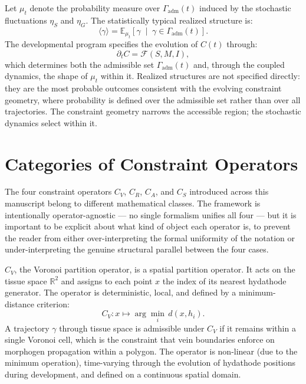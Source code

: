 \documentclass[12pt, a4paper, openany]{book}
\theoremstyle{definition}
\theoremstyle{remark}
\begin{document}
\begin{appendices}
Let $\mu_t$ denote the probability measure over $\Gamma_{\mathrm{adm}}(t)$ induced by the stochastic fluctuations $\eta_S$ and $\eta_G$. The statistically typical realized structure is:
\begin{equation}
\langle \gamma \rangle = \mathbb{E}_{\mu_t}\!\left[ \gamma \;\middle|\; \gamma \in \Gamma_{\mathrm{adm}}(t) \right].
\end{equation}
The developmental program specifies the evolution of $C(t)$ through:
\begin{equation}
\partial_t C = \mathcal{F}(S, M, I),
\end{equation}
which determines both the admissible set $\Gamma_{\mathrm{adm}}(t)$ and, through the coupled dynamics, the shape of $\mu_t$ within it. Realized structures are not specified directly: they are the most probable outcomes consistent with the evolving constraint geometry, where probability is defined over the admissible set rather than over all trajectories. The constraint geometry narrows the accessible region; the stochastic dynamics select within it.

\chapter{Categories of Constraint Operators}

The four constraint operators $C_V$, $C_R$, $C_A$, and $C_S$ introduced across this manuscript belong to different mathematical classes. The framework is intentionally operator-agnostic — no single formalism unifies all four — but it is important to be explicit about what kind of object each operator is, to prevent the reader from either over-interpreting the formal uniformity of the notation or under-interpreting the genuine structural parallel between the four cases.

$C_V$, the Voronoi partition operator, is a spatial partition operator. It acts on the tissue space $\mathbb{R}^2$ and assigns to each point $x$ the index of its nearest hydathode generator. The operator is deterministic, local, and defined by a minimum-distance criterion:
\begin{equation}
C_V : x \mapsto \arg\min_i\, d(x, h_i).
\end{equation}
A trajectory $\gamma$ through tissue space is admissible under $C_V$ if it remains within a single Voronoi cell, which is the constraint that vein boundaries enforce on morphogen propagation within a polygon. The operator is non-linear (due to the minimum operation), time-varying through the evolution of hydathode positions during development, and defined on a continuous spatial domain.


\end{appendices}
\end{document}
